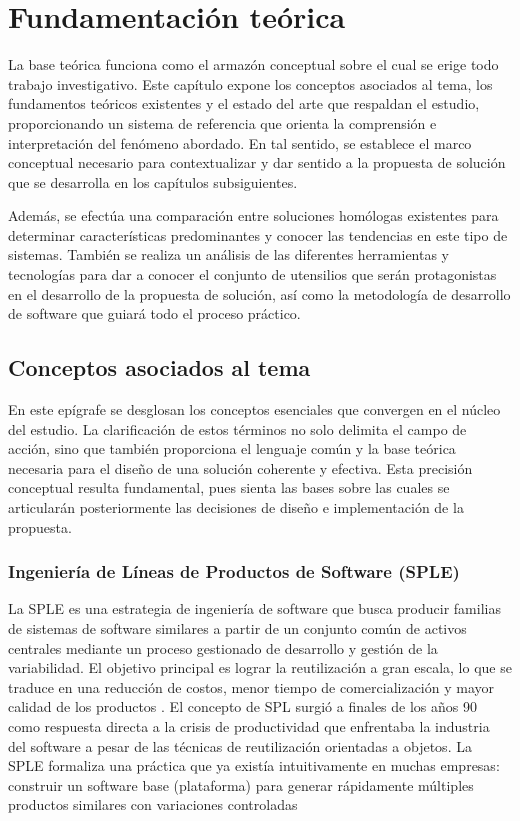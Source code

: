 \chapter{Fundamentación teórica}

\label{chap:chapter1}

La base teórica funciona como el armazón conceptual sobre el cual se erige todo
trabajo investigativo. Este capítulo expone los conceptos asociados al tema, los
fundamentos teóricos existentes y el estado del arte que respaldan 
el estudio, proporcionando un sistema de referencia que orienta la comprensión 
e interpretación del fenómeno abordado. En tal sentido, 
se establece el marco conceptual necesario para contextualizar y dar sentido a 
la propuesta de solución que se desarrolla en los capítulos subsiguientes.

Además, se efectúa una comparación entre soluciones homólogas existentes para determinar características
predominantes y conocer las tendencias en este tipo de sistemas. También se 
realiza un análisis de las diferentes herramientas y tecnologías para dar a conocer
el conjunto de utensilios que serán protagonistas en el desarrollo de la propuesta de
solución, así como la metodología de desarrollo de software que guiará todo el proceso práctico.

\section{Conceptos asociados al tema}

En este epígrafe se desglosan los conceptos esenciales que convergen en el
núcleo del estudio. La clarificación de
estos términos no solo delimita el campo de acción, sino que también
proporciona el lenguaje común y la base teórica necesaria para el diseño de
una solución coherente y efectiva. Esta precisión conceptual resulta fundamental, 
pues sienta las bases sobre las cuales se articularán posteriormente las decisiones 
de diseño e implementación de la propuesta.

\subsection{Ingeniería de Líneas de Productos de Software (SPLE)}

La \ac{SPLE} es una estrategia de
ingeniería de software que busca producir familias de sistemas de software
similares a partir de un conjunto común de activos centrales mediante un
proceso gestionado de desarrollo y gestión de la variabilidad. El objetivo
principal es lograr la reutilización a gran escala, lo que se traduce en una reducción
de costos, menor tiempo de comercialización y mayor calidad de los
productos \citep{sgbuzz_lps}. El concepto de
\ac{SPL} surgió a finales de los años 90 como respuesta directa a la crisis de
productividad que enfrentaba la industria del software a pesar de las técnicas
de reutilización orientadas a objetos. La \ac{SPLE} formaliza una práctica que ya
existía intuitivamente en muchas empresas: construir un software base
(plataforma) para generar rápidamente múltiples productos similares con
variaciones controladas \citep{academialab_linea_productos}

